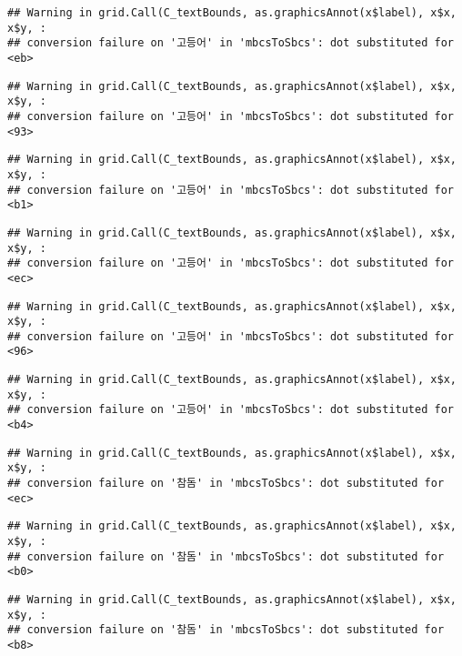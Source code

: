 \documentclass[
]{article}
\begin{document}
\begin{verbatim}
## Warning in grid.Call(C_textBounds, as.graphicsAnnot(x$label), x$x, x$y, :
## conversion failure on '고등어' in 'mbcsToSbcs': dot substituted for <eb>
\end{verbatim}

\begin{verbatim}
## Warning in grid.Call(C_textBounds, as.graphicsAnnot(x$label), x$x, x$y, :
## conversion failure on '고등어' in 'mbcsToSbcs': dot substituted for <93>
\end{verbatim}

\begin{verbatim}
## Warning in grid.Call(C_textBounds, as.graphicsAnnot(x$label), x$x, x$y, :
## conversion failure on '고등어' in 'mbcsToSbcs': dot substituted for <b1>
\end{verbatim}

\begin{verbatim}
## Warning in grid.Call(C_textBounds, as.graphicsAnnot(x$label), x$x, x$y, :
## conversion failure on '고등어' in 'mbcsToSbcs': dot substituted for <ec>
\end{verbatim}

\begin{verbatim}
## Warning in grid.Call(C_textBounds, as.graphicsAnnot(x$label), x$x, x$y, :
## conversion failure on '고등어' in 'mbcsToSbcs': dot substituted for <96>
\end{verbatim}

\begin{verbatim}
## Warning in grid.Call(C_textBounds, as.graphicsAnnot(x$label), x$x, x$y, :
## conversion failure on '고등어' in 'mbcsToSbcs': dot substituted for <b4>
\end{verbatim}

\begin{verbatim}
## Warning in grid.Call(C_textBounds, as.graphicsAnnot(x$label), x$x, x$y, :
## conversion failure on '참돔' in 'mbcsToSbcs': dot substituted for <ec>
\end{verbatim}

\begin{verbatim}
## Warning in grid.Call(C_textBounds, as.graphicsAnnot(x$label), x$x, x$y, :
## conversion failure on '참돔' in 'mbcsToSbcs': dot substituted for <b0>
\end{verbatim}

\begin{verbatim}
## Warning in grid.Call(C_textBounds, as.graphicsAnnot(x$label), x$x, x$y, :
## conversion failure on '참돔' in 'mbcsToSbcs': dot substituted for <b8>
\end{verbatim}
\end{document}
